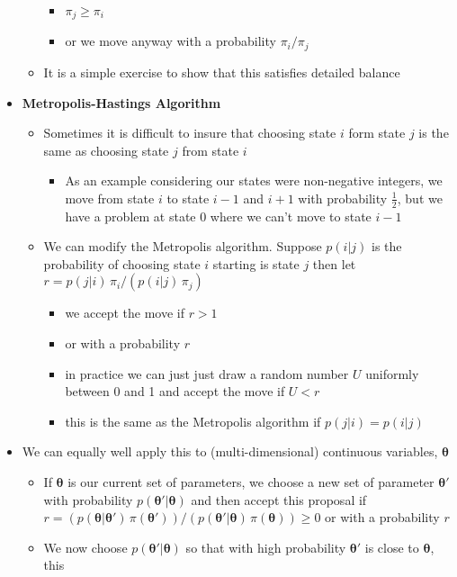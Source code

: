 \documentclass[11pt]{article}
\begin{document}
\begin{itemize}
\begin{itemize}
\begin{itemize}
\item \(\pi_{j} \geq \pi_{i}\)
\item or we move anyway with a probability \(\pi_{i}/\pi_{j}\)
\end{itemize}
\item It is a simple exercise to show that this satisfies detailed balance
\end{itemize}
\item \textbf{Metropolis-Hastings Algorithm}
\begin{itemize}
\item Sometimes it is difficult to insure that choosing state \(i\)
form state \(j\) is the same as choosing state \(j\) from state \(i\)
\begin{itemize}
\item As an example considering our states were non-negative
integers, we move from state \(i\) to state \(i-1\) and \(i+1\)
with probability \(\tfrac{1}{2}\), but we have a problem at
state 0 where we can't move to state \(i-1\)
\end{itemize}
\item We can modify the Metropolis algorithm.  Suppose \(p(i|j)\) is
the probability of choosing state \(i\) starting is state \(j\)
then let \(r = p(j|i) \, \pi_{i}/ (p(i|j)\,\pi_{j})\)
\begin{itemize}
\item we accept the move if \(r>1\)
\item or with a probability \(r\)
\item in practice we can just just draw a random number \(U\)
uniformly between 0 and 1 and accept the move if \(U<r\)
\item this is the same as the Metropolis algorithm if \(p(j|i) = p(i|j)\)
\end{itemize}
\end{itemize}
\item We can equally well apply this to (multi-dimensional) continuous
variables, \(\bm{\theta}\)
\begin{itemize}
\item If \(\bm{\theta}\) is our current set of parameters, we choose a
new set of parameter \(\bm{\theta}'\) with probability
\(p(\bm{\theta}'|\bm{\theta})\) and then accept this proposal if
\(r = (p(\bm{\theta}|\bm{\theta}') \, \pi(\bm{\theta}'))/
       (p(\bm{\theta}'|\bm{\theta}) \, \pi(\bm{\theta})) \geq 0\) or
with a probability \(r\)
\item We now choose \(p(\bm{\theta}'|\bm{\theta})\) so that with high
probability \(\bm{\theta}'\) is close to \(\bm{\theta}\), this

\end{itemize}
\end{itemize}
\end{document}
